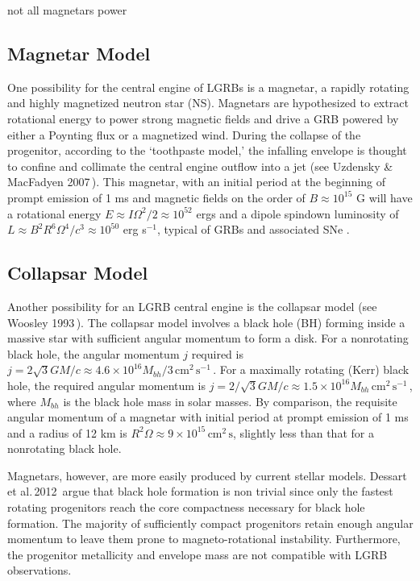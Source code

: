 \documentclass{article}
\begin{document}
not all magnetars power
\subsection{Magnetar Model}

One possibility for the central engine of LGRBs is a magnetar, a rapidly rotating and highly magnetized neutron star (NS). Magnetars are hypothesized to extract rotational energy to power strong magnetic fields and drive a GRB powered by either a Poynting flux or a magnetized wind. During the collapse of the progenitor, according to the `toothpaste model,' the infalling envelope is thought to confine and collimate the central engine outflow into a jet (see Uzdensky \& MacFadyen 2007\,\cite{Uzdensky:2006wj}). This magnetar, with an initial period at the beginning of prompt emission of 1 ms and magnetic fields on the order of $B \approx 10^{15}$ G will have a rotational energy $E \approx I \Omega^2/2 \approx 10^{52}$ ergs and a dipole spindown luminosity of $L \approx B^2 R^6\Omega^4/c^3 \approx 10^{50}$ erg s$^{-1}$, typical of GRBs and associated SNe \cite{Woosley:2006fn}. 

\subsection{Collapsar Model}

Another possibility for an LGRB central engine is the collapsar model (see Woosley 1993\,\cite{Woosley:1993ap}). The collapsar model involves a black hole (BH) forming inside a massive star with sufficient angular momentum to form a disk. For a nonrotating black hole, the angular momentum $j$ required is $j=2 \sqrt{3} GM/c\approx 4.6 \times 10^{16} M_{bh}/3\,\mathrm{cm}^2\,\mathrm{s}^{-1}$\,\cite{Woosley:2006fn}. For a maximally rotating (Kerr) black hole, the required angular momentum is $j=2/\sqrt{3} GM/c \approx 1.5 \times 10^{16} M_{bh}\,\mathrm{cm}^2\,\mathrm{s}^{-1}$\,\cite{Woosley:2006fn}, where $M_{bh}$ is the black hole mass in solar masses.  By comparison, the requisite angular momentum of a magnetar with initial period at prompt emission of 1 ms and a radius of 12 km is $R^2 \Omega \approx 9 \times 10^{15}$\,$\mathrm{cm}^2\,\mathrm{s}$, slightly less than that for a nonrotating black hole.

Magnetars, however, are more easily produced by current stellar models. Dessart et al.\,2012\,\cite{Dessart:2012ap} argue that black hole formation is non trivial since only the fastest rotating progenitors reach the core compactness necessary for black hole formation. The majority of sufficiently compact progenitors retain enough angular momentum to leave them prone to magneto-rotational instability. Furthermore, the progenitor metallicity and envelope mass are not compatible with LGRB observations. 
\end{document}
